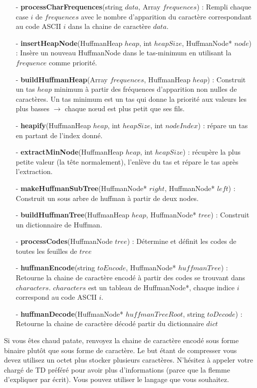 \documentclass[11pt]{extarticle}
\begin{document}
\begin{itemize}

\item[ - \textbf{processCharFrequences}(string $data$, Array $frequences$)]: Rempli chaque case $i$ de $frequences$ avec le nombre d'apparition du caractère correspondant au code ASCII $i$ dans la chaine de caractère $data$.
\item[ - \textbf{insertHeapNode}(HuffmanHeap $heap$, int $heapSize$, HuffmanNode* $node$)]: Insère un nouveau HuffmanNode dans le tas-minimum en utilisant la $frequence$ comme priorité.
\item[ - \textbf{buildHuffmanHeap}(Array $frequences$, HuffmanHeap $heap$)]: Construit un tas $heap$ minimum à partir des fréquences d'apparition non nulles de caractères. Un tas minimum est un tas qui donne la priorité aux valeurs les plus basses $\rightarrow$ chaque nœud est plus petit que ses fils.
\item[ - \textbf{heapify}(HuffmanHeap $heap$,  int $heapSize$, int $nodeIndex$)]: répare un tas en partant de l'index donné.
\item[ - \textbf{extractMinNode}(HuffmanHeap $heap$,  int $heapSize$)]: récupère la plus petite valeur (la tête normalement), l'enlève du tas et répare le tas après l'extraction.

\item[ - \textbf{makeHuffmanSubTree}(HuffmanNode* $right$, HuffmanNode* $left$)]: Construit un sous arbre de huffman à partir de deux nodes.
\item[ - \textbf{buildHuffmanTree}(HuffmanHeap $heap$, HuffmanNode* $tree$)]: Construit un dictionnaire de Huffman.
\item[ - \textbf{processCodes}(HuffmanNode $tree$)]: Détermine et définit les codes de toutes les feuilles de $tree$

\item[ - \textbf{huffmanEncode}(string $toEncode$, HuffmanNode* $huffmanTree$)]: Retourne la chaine de caractère encodé à partir des codes se trouvant dans $characters$. $characters$ est un tableau de HuffmanNode*, chaque indice $i$ correspond au code ASCII $i$. 
\item[ - \textbf{huffmanDecode}(HuffmanNode* $huffmanTreeRoot$, string $toDecode$)]: Retourne la chaine de caractère décodé partir du dictionnaire $dict$
\end{itemize}\vspace{1cm}


Si vous êtes chaud patate, renvoyez la chaine de caractère encodé sous forme binaire plutôt que sous forme de caractère. Le but étant de compresser vous devez utilisez un octet plus stocker plusieurs caractères. N'hésitez à appeler votre chargé de TD préféré pour avoir plus d'informations (parce que la flemme d'expliquer par écrit).
Vous pouvez utiliser le langage que vous souhaitez.
\end{document}
